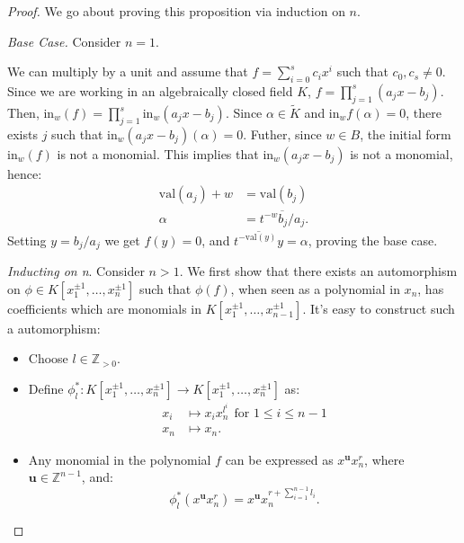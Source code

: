     \begin{proof}
        We go about proving this proposition via induction on $n$.
        \par \textit{Base Case.} Consider $n = 1$.
        \par We can multiply by a unit and assume that $f = \sum_{i=0}^{s}c_{i}x^{i}$ such that $c_{0}, c_{s}\neq0$. 
        Since we are working in an algebraically closed field $K$, $f = \prod^{s}_{j=1} (a_{j}x-b_{j})$. 
        Then, $\text{in}_{w}(f) = \prod^{s}_{j=1} \text{in}_{w}(a_{j}x-b_{j})$. 
        Since $\alpha \in \tilde{K}$ and $\text{in}_{w}f(\alpha)=0$, there exists $j$ such that $\text{in}_{w}(a_{j}x-b_{j})(\alpha) = 0$.
        Futher, since $w \in B$, the initial form $\text{in}_{w}(f)$ is not a monomial.
        This implies that $\text{in}_{w}(a_{j}x-b_{j})$ is not a monomial, hence:
        \begin{align*}
            \text{val}(a_{j}) + w &= \text{val}(b_{j})\\
            \alpha &= \overline{t^{-w}b_{j}/a_{j}}.
        \end{align*}
        Setting $y = b_{j}/a_{j}$ we get $f(y) = 0$, and $\overline{t^{-\text{val}(y)}y} = \alpha$, proving the base case.
        \par \textit{Inducting on n}. Consider $n>1$.       
        We first show that there exists an automorphism on $\phi \in K[x_{1}^{\pm1}, \dots, x_{n}^{\pm1}]$ such that $\phi(f)$, when seen as a polynomial in $x_{n}$, has coefficients which are monomials in $ K[x_{1}^{\pm1}, \dots, x_{n-1}^{\pm1}]$. 
        It's easy to construct such a automorphism:
        \begin{itemize}
            \item Choose $l \in \mathbb{Z}_{>0}$.
            \item Define $\phi^{*}_{l}: K[x_{1}^{\pm1}, \dots, x_{n}^{\pm1}] \to  K[x_{1}^{\pm1}, \dots, x_{n}^{\pm1}]$ as:
                \begin{align*}
                    x_{i} &\mapsto x_{i}x_{n}^{l^{i}}~~\text{for }1\leq i\leq n-1\\
                    x_{n} &\mapsto x_{n}.
                \end{align*}
            \item Any monomial in the polynomial $f$ can be expressed as $x^{\textbf{u}}x_{n}^{r}$, where $\textbf{u} \in \mathbb{Z}^{n-1}$, and:
                \[
                    \phi^{*}_{l}(x^{\textbf{u}}x_{n}^{r}) = x^{\textbf{u}}x_{n}^{r+\sum_{i=1}^{n-1}l_{i}}.
\]
\end{itemize}
\end{proof}
